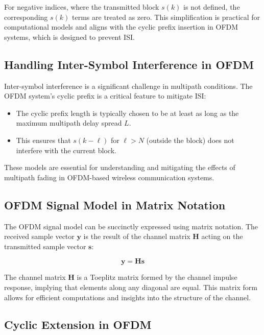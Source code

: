For negative indices, where the transmitted block \(s(k)\) is not defined, the corresponding \(s(k)\) terms are treated as zero. This simplification is practical for computational models and aligns with the cyclic prefix insertion in OFDM systems, which is designed to prevent ISI.

\subsection*{Handling Inter-Symbol Interference in OFDM}

Inter-symbol interference is a significant challenge in multipath conditions. The OFDM system's cyclic prefix is a critical feature to mitigate ISI:

\begin{itemize}
    \item The cyclic prefix length is typically chosen to be at least as long as the maximum multipath delay spread \(L\).
    \item This ensures that \(s(k - \ell)\) for \(\ell > N\) (outside the block) does not interfere with the current block.
\end{itemize}

These models are essential for understanding and mitigating the effects of multipath fading in OFDM-based wireless communication systems.


\subsection*{OFDM Signal Model in Matrix Notation}

The OFDM signal model can be succinctly expressed using matrix notation. The received sample vector \(\mathbf{y}\) is the result of the channel matrix \(\mathbf{H}\) acting on the transmitted sample vector \(\mathbf{s}\):

\begin{equation}
    \mathbf{y} = \mathbf{H} \mathbf{s}
\end{equation}

The channel matrix \(\mathbf{H}\) is a Toeplitz matrix formed by the channel impulse response, implying that elements along any diagonal are equal. This matrix form allows for efficient computations and insights into the structure of the channel.

\subsection*{Cyclic Extension in OFDM}

